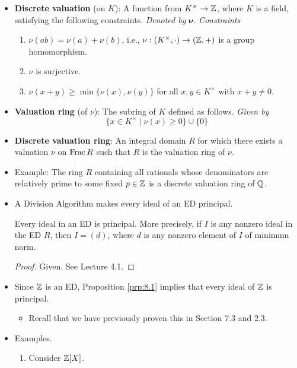 \documentclass[../notes.tex]{subfiles}
\begin{document}
\begin{itemize}
    \item \textbf{Discrete valuation} (on $K$): A function from $K^\times\to\mathbb{Z}$, where $K$ is a field, satisfying the following constraints. \emph{Denoted by} $\bm{\nu}$. \emph{Constraints}
    \begin{enumerate}[label={(\roman*)}]
        \item $\nu(ab)=\nu(a)+\nu(b)$, i.e., $\nu:(K^\times,\cdot)\to(\mathbb{Z},+)$ is a group homomorphism.
        \item $\nu$ is surjective.
        \item $\nu(x+y)\geq\min\{\nu(x),\nu(y)\}$ for all $x,y\in K^\times$ with $x+y\neq 0$.
    \end{enumerate}
    \item \textbf{Valuation ring} (of $\nu$): The subring of $K$ defined as follows. \emph{Given by}
    \begin{equation*}
        \{x\in K^\times\mid\nu(x)\geq 0\}\cup\{0\}
    \end{equation*}
    \item \textbf{Discrete valuation ring}: An integral domain $R$ for which there exists a valuation $\nu$ on $\operatorname{Frac} R$ such that $R$ is the valuation ring of $\nu$.
    \item Example: The ring $R$ containing all rationals whose denominators are relatively prime to some fixed $p\in\mathbb{Z}$ is a discrete valuation ring of $\mathbb{Q}$.
    \item A Division Algorithm makes every ideal of an ED principal.
    \begin{proposition}\label{prp:8.1}
        Every ideal in an ED is principal. More precisely, if $I$ is any nonzero ideal in the ED $R$, then $I=(d)$, where $d$ is any nonzero element of $I$ of minimum norm.
        \begin{proof}
            Given. See Lecture 4.1.
        \end{proof}
    \end{proposition}
    \item Since $\mathbb{Z}$ is an ED, Proposition \ref{prp:8.1} implies that every ideal of $\mathbb{Z}$ is principal.
    \begin{itemize}
        \item Recall that we have previously proven this in Section 7.3 and 2.3.
    \end{itemize}
    \item Examples.
    \begin{enumerate}
        \item Consider $\mathbb{Z}[X]$.
        \begin{itemize}

\end{itemize}
\end{enumerate}
\end{itemize}
\end{document}
